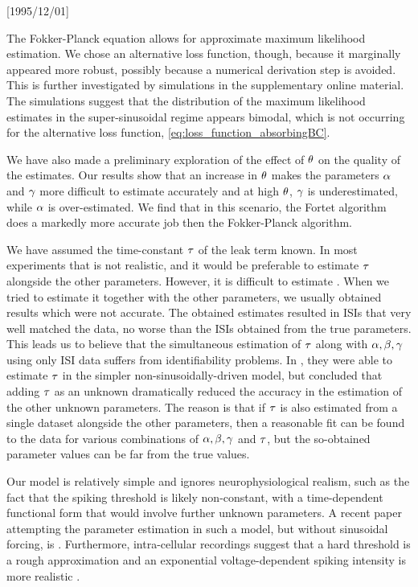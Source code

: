 \NeedsTeXFormat{LaTeX2e}[1995/12/01] \documentclass[10pt]{bmc_article}
\newenvironment{bmcformat}{\begin{raggedright}\baselineskip20pt\sloppy\setboolean{publ}{false}}{\end{raggedright}\baselineskip20pt\sloppy}
\begin{document}
\begin{bmcformat}
The Fokker-Planck equation allows for approximate maximum likelihood
estimation. We chose an alternative loss function, though, because it
marginally appeared more robust, possibly because a numerical derivation
step is avoided. This is further investigated by simulations in the
supplementary online material. The simulations suggest that the
distribution of the maximum likelihood estimates in the super-sinusoidal
regime appears bimodal, which is not occurring for the alternative loss
function, \cref{eq:loss_function_absorbingBC}. %

We have also made a preliminary exploration of the effect of ${\theta}$ on the
quality of the estimates. Our results show that an increase in ${\theta}$ makes the
parameters ${\alpha}$ and ${\gamma }$ more difficult to estimate accurately and at high
${\theta}$, ${\gamma }$ is underestimated, while ${\alpha}$ is over-estimated. We find that in
this scenario, the Fortet algorithm does a markedly more accurate job then the
Fokker-Planck algorithm.
 
We have assumed  the time-constant ${\tau}$ of the leak term known. In most
experiments that is not realistic, and it would be preferable to estimate ${\tau}$
alongside the other parameters. However, it is difficult to estimate
\cite{DitlevsenLansky212}. When we tried to estimate it together with the other
parameters, we usually obtained results which were not accurate. The obtained
estimates resulted in ISIs that very well matched the data, no worse than the
ISIs obtained from the true parameters. This leads us to believe that the
simultaneous estimation of ${\tau}$ along with ${{\alpha},{\beta},{\gamma } }$ using only ISI data suffers
from identifiability problems. In \cite{Mullowney2008}, they were able to
estimate ${\tau}$ in the simpler non-sinusoidally-driven model, but concluded that
adding ${\tau}$ as an unknown dramatically reduced the accuracy in the estimation of
the other unknown parameters. The reason is that if ${\tau}$ is also estimated from
a single dataset alongside the other parameters, then a reasonable fit can be
found to the data for various combinations of ${{\alpha},{\beta},{\gamma } }$ and ${\tau}$, but the so-obtained
parameter values can be far from the true values.

Our model is relatively simple and ignores neurophysiological realism, such as
the fact that the spiking threshold is likely non-constant, with a
time-dependent functional form that would involve further unknown parameters. A
recent paper attempting the parameter estimation in such a model, but without
sinusoidal forcing, is \cite{Dong2011}. Furthermore, intra-cellular recordings
suggest that a hard threshold is a rough approximation and an exponential
voltage-dependent spiking intensity is more realistic \cite{Jahn2011}.


\end{bmcformat}
\end{document}

